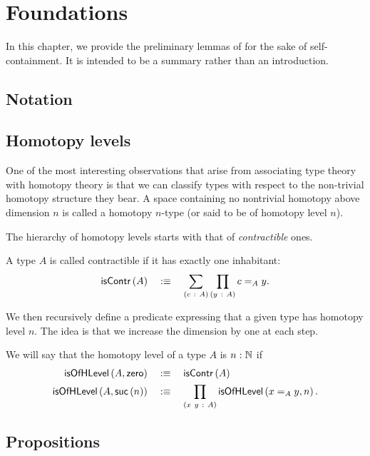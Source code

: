 \chapter{Foundations}\label{chap:foundations}

In this chapter, we provide the preliminary lemmas of \UF{} for the sake of
self-containment. It is intended to be a summary rather than an introduction.

\section{Notation}

\section{Homotopy levels}

One of the most interesting observations that arise from associating type theory with
homotopy theory is that we can classify types with respect to the non-trivial homotopy
structure they bear. A space containing no nontrivial homotopy above dimension $n$ is
called a homotopy $n$-type (or said to be of homotopy level $n$).

The hierarchy of homotopy levels starts with that of \emph{contractible} ones.
\begin{defn}[Contractible]
  A type $A$ is called contractible if it has exactly one inhabitant:
  \begin{equation*}
    \mathsf{isContr}\left(A\right) \quad:\equiv\quad \sum_{(c~:~A)} \prod_{(y~:~A)} c =_A y.
  \end{equation*}
\end{defn}

We then recursively define a predicate expressing that a given type has homotopy level
$n$. The idea is that we increase the dimension by one at each step.
\begin{defn}
  We will say that the homotopy level of a type $A$ is $n\hspace{0.1mm}:\hspace{0.1mm}\mathbb{N}$ if
  \begin{align*}
    \mathsf{isOfHLevel}\left(A, \mathsf{zero}{}\right) &\quad:\equiv\quad \mathsf{isContr}\left(A\right)\\
    \mathsf{isOfHLevel}\left(A, \mathsf{suc}\left(n\right)\right) &\quad:\equiv\quad \prod_{(x~y~:~A)} \mathsf{isOfHLevel}\left(x =_A y, n\right).
  \end{align*}
\end{defn}

\section{Propositions}


